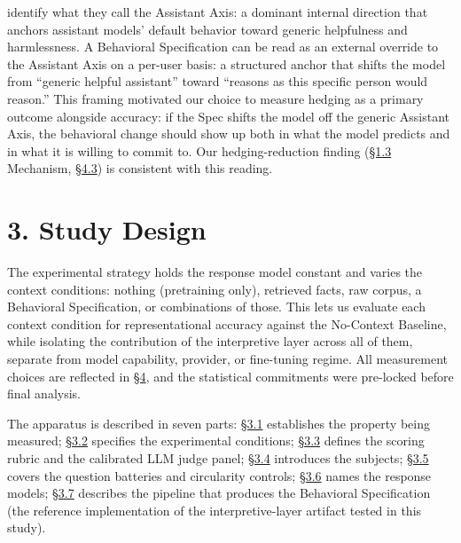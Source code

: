 \textbf{\citet{lu2026assistantaxis}} identify what they call the
Assistant Axis: a dominant internal direction that anchors assistant
models' default behavior toward generic helpfulness and harmlessness. A
Behavioral Specification can be read as an external override to the
Assistant Axis on a per-user basis: a structured anchor that shifts the
model from ``generic helpful assistant'' toward ``reasons as this
specific person would reason.'' This framing motivated our choice to
measure hedging as a primary outcome alongside accuracy: if the Spec
shifts the model off the generic Assistant Axis, the behavioral change
should show up both in what the model predicts and in what it is willing
to commit to. Our hedging-reduction finding (\hyperref[what-we-found]{§1.3} Mechanism, \hyperref[mechanism-correct-content-not-format]{§4.3}) is
consistent with this reading.

\hypertarget{study-design}{%
\section{3. Study Design}\label{study-design}}

The experimental strategy holds the response model constant and varies
the context conditions: nothing (pretraining only), retrieved facts, raw
corpus, a Behavioral Specification, or combinations of those. This lets
us evaluate each context condition for representational accuracy against
the No-Context Baseline, while isolating the contribution of the
interpretive layer across all of them, separate from model capability,
provider, or fine-tuning regime. All measurement choices are reflected
in \hyperref[results]{§4}, and the statistical commitments were pre-locked before final
analysis.

The apparatus is described in seven parts: \hyperref[operationalizing-representational-accuracy-via-the-behavioral-specification]{§3.1} establishes the property
being measured; \hyperref[experimental-conditions]{§3.2} specifies the experimental conditions; \hyperref[scoring-rubric-with-calibrated-llm-judge-panel]{§3.3} defines
the scoring rubric and the calibrated LLM judge panel; \hyperref[subjects]{§3.4} introduces
the subjects; \hyperref[question-battery-formation]{§3.5} covers the question batteries and circularity
controls; \hyperref[response-models]{§3.6} names the response models; \hyperref[pipeline-for-the-behavioral-specification]{§3.7} describes the pipeline
that produces the Behavioral Specification (the reference implementation
of the interpretive-layer artifact tested in this study).

